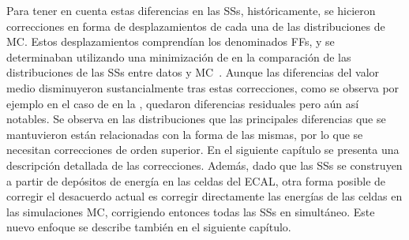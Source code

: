 Para tener en cuenta estas diferencias en las \acp{SS}, históricamente, se hicieron correcciones en forma de desplazamientos de cada una de las distribuciones de \ac{MC}. Estos desplazamientos comprendían los denominados \acfp{FF}, y se determinaban utilizando una minimización de \chisq en la comparación de las distribuciones de las \acp{SS} entre datos y \ac{MC}~\cite{ATLAS-EGamma-Performance-2015-2016,ATLAS-EGamma-Performance-2015-2017}.
Aunque las diferencias del valor medio disminuyeron sustancialmente tras estas correcciones, como se observa por ejemplo en el caso de \fside en la \Fig{\ref{fig:pid_ss:ss_differences:ss:fside}}, quedaron diferencias residuales pero a\'un as\'i notables. Se observa en las distribuciones que las principales diferencias que se mantuvieron están relacionadas con la forma de las mismas, por lo que se necesitan correcciones de orden superior. En el siguiente capítulo se presenta una descripción detallada de las correcciones.
Además, dado que las \acp{SS} se construyen a partir de depósitos de energía en las celdas del \ac{ECAL}, otra forma posible de corregir el desacuerdo actual es corregir directamente las energías de las celdas en las simulaciones \ac{MC}, corrigiendo entonces todas las \acp{SS} en simult\'aneo. Este nuevo enfoque se describe también en el siguiente capítulo.